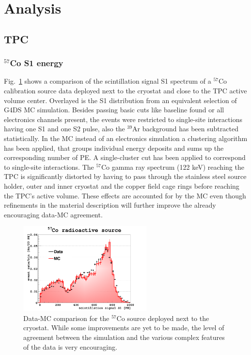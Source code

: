 \section{Analysis}\label{sec:analysis}

\subsection{TPC}

\subsubsection{$^{57}$Co S1 energy}
Fig.~\ref{fig:CalibData:Co57} shows a comparison of the scintillation signal S1 spectrum of a $^{57}$Co calibration source data deployed next to the cryostat and close to the TPC active volume center. Overlayed is the S1 distribution from an equivalent selection of G4DS MC simulation. Besides passing basic cuts like baseline found or all electronics channels present, the events were restricted to single-site interactions having one S1 and one S2 pulse, also the $^{39}$Ar background has been subtracted statistically. In the MC instead of an electronics simulation a clustering algorithm has been applied, that groups individual energy deposits and sums up the corresponding number of PE. A single-cluster cut has been applied to correspond to single-site interactions. The $^{57}$Co gamma ray spectrum (122 keV) reaching the TPC is significantly distorted by having to pass through the stainless steel source holder, outer and inner cryostat and the copper field cage rings before reaching the TPC's active volume.  These effects are accounted for by the MC even though refinements in the material description will further improve the already encouraging data-MC agreement. 

\begin{figure}[htbp]
\centering
\includegraphics[width=0.6\textwidth]{./Figures/Co57_LArTPC_center.png}
\caption{Data-MC comparison for the $^{57}$Co source deployed next to the cryostat. While some improvements are yet to be made, the level of agreement between the simulation and the various complex features of the data is very encouraging.
\label{fig:CalibData:Co57}}
 \end{figure}


